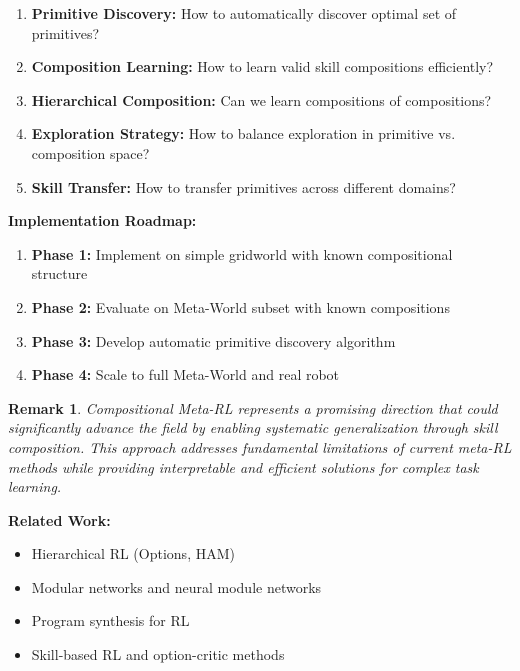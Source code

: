 \documentclass[12pt]{article}
\newcommand{\ieee}[1]{\textcolor{IEEEBlue}{\textbf{#1}}}
\newtheorem{remark}{Remark}
\begin{document}
{{			\begin{enumerate}
				\item \textbf{Primitive Discovery:} How to automatically discover optimal set of primitives?
				\item \textbf{Composition Learning:} How to learn valid skill compositions efficiently?
				\item \textbf{Hierarchical Composition:} Can we learn compositions of compositions?
				\item \textbf{Exploration Strategy:} How to balance exploration in primitive vs. composition space?
				\item \textbf{Skill Transfer:} How to transfer primitives across different domains?
			\end{enumerate}
			
			\ieee{Implementation Roadmap:}
			
			\begin{enumerate}
				\item \textbf{Phase 1:} Implement on simple gridworld with known compositional structure
				\item \textbf{Phase 2:} Evaluate on Meta-World subset with known compositions
				\item \textbf{Phase 3:} Develop automatic primitive discovery algorithm
				\item \textbf{Phase 4:} Scale to full Meta-World and real robot
			\end{enumerate}
			
			\begin{remark}
			Compositional Meta-RL represents a promising direction that could significantly advance the field by enabling systematic generalization through skill composition. This approach addresses fundamental limitations of current meta-RL methods while providing interpretable and efficient solutions for complex task learning.
			\end{remark}
			
			\ieee{Related Work:}
			
			\begin{itemize}
				\item Hierarchical RL (Options, HAM)
				\item Modular networks and neural module networks
				\item Program synthesis for RL
				\item Skill-based RL and option-critic methods
			\end{itemize}
			
}}
\end{document}

